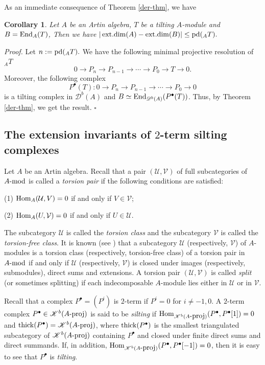 \documentclass[12pt]{article}
\numberwithin{equation}{section}
\newtheorem{Koro}[Def]{Corollary}
\theoremstyle{definition}
\newcommand{\End}{{\rm End}}
\def\ed{\mathop{\rm ext.dim}\nolimits}
\newcommand{\pd}{{\rm pd}}
\newcommand{\U}{{\mathcal U}}
\newcommand{\V}{{\mathcal V}}
\newcommand{\Db}[1]{{\mathscr D}^b(#1)}
\newcommand{\Kb}[1]{{\mathscr K}^b(#1)}
\newcommand{\modcat}{\ensuremath{\mbox{{\rm -mod}}}}
\newcommand{\pmodcat}[1]{#1\mbox{{\rm -proj}}}
\newcommand{\Hom}{{\rm Hom}}
\newcommand{\lra}{\longrightarrow}
\begin{document}
As an immediate consequence of Theorem \ref{der-thm}, we have
\begin{Koro}
Let $A$ be an Artin algebra, $T$ be a tilting $A$-module and $B=\End_{A}(T)$, Then we have
$|\ed(A)-\ed(B)|\le \pd(_AT).$
\end{Koro}
{\it Proof.} Let $n:=\pd(_AT).$ We have the following  minimal projective resolution of $_AT$
$$0\lra  P_{n}\lra P_{n-1}\lra \cdots\lra P_{0}\lra T\lra 0.$$ Moreover, the following complex
$$P^{\bullet}(T):  0\lra  P_{n}\lra P_{n-1}\lra \cdots\lra P_{0}\lra 0 $$
is a tilting complex in $\Db{A}$ and $B\simeq \End_{\Db{A}}(P^{\bullet}(T))$. Thus, by Theorem \ref{der-thm}, we get the result.
$\square$

\subsection{The extension invariants of $2$-term silting complexes}\label{der-inv}
Let $A$ be an Artin algebra. Recall that a pair $(\U,\V)$ of full subcategories of $A\modcat$ is called a \emph{torsion pair} \cite{d66} if the following conditions are satisfied:

(1) $\Hom_A(\U,V)=0$ if and only if $V\in\V$;

(2) $\Hom_A(U,\V)=0$ if and only if $U\in \U$.

The subcategory $\U$ is called the \emph{torsion class} and the subcategory $\V$ is called the \emph{torsion-free class}. It is
known (see \cite[Proposition 1.1]{Assem1990}) that a subcategory $\U$ (respectively, $\V$) of $A$-modules is a torsion class (respectively, torsion-free class) of a torsion pair in $A\modcat$ if and only if $\U$ (respectively, $\V$) is closed under images (respectively, submodules), direct sums and extensions. A torsion pair $(\U,\V)$ is called {\em split} (or sometimes splitting) if each indecomposable $A$-module lies either in $\U$ or in $\V$.

Recall that a complex $P^{\bullet}=(P^i)$ is $2$-term if $P^i=0$ for $i\neq -1,0$. A $2$-term complex $P^{\bullet}\in \Kb{\pmodcat{A}}$ is said to be \emph{silting} \cite{kv88} if $\Hom_{\Kb{\pmodcat{A}}}(P^{\bullet},P^{\bullet}[1])=0$ and ${\rm thick}(P^{\bullet})=\Kb{\pmodcat{A}}$, where ${\rm thick}(P^{\bullet})$ is the smallest triangulated subcategory of $\Kb{\pmodcat{A}}$ containing $P^{\bullet}$ and closed under finite direct sums and direct summands. If, in addition, $\Hom_{\Kb{\pmodcat{A}}}(P^{\bullet},P^{\bullet}[-1])=0$, then it is easy to see that $P^{\bullet}$ is {\em tilting}.
\end{document}
